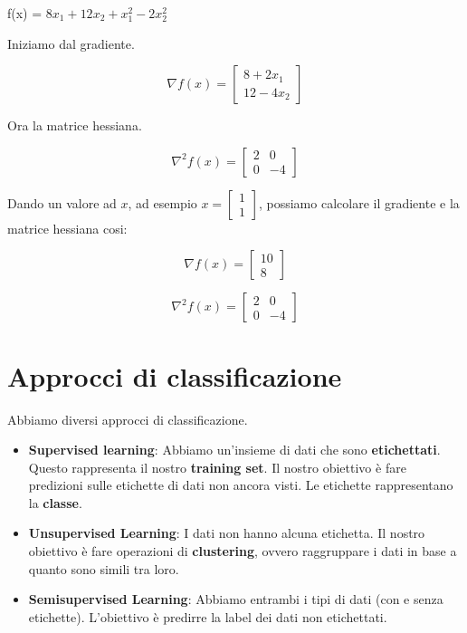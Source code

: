 \begin{esempio}
    f(x) = $8x_1 + 12x_2 + x_1^2 - 2x_2^2$

    Iniziamo dal gradiente.

    $$
        \nabla f(x) = \begin{bmatrix}
            8 +2x_1 \\
            12 - 4x_2
        \end{bmatrix}
    $$

    Ora la matrice hessiana.

    $$
        \nabla^2 f(x) = \begin{bmatrix}
            2 & 0  \\
            0 & -4
        \end{bmatrix}
    $$
    
    Dando un valore ad $x$, ad esempio $x = \begin{bmatrix}
        1 \\
        1
    \end{bmatrix}$, possiamo calcolare il gradiente e la matrice hessiana cosi:

    $$
        \nabla f(x) = \begin{bmatrix}
            10 \\
            8
        \end{bmatrix}
    $$

    $$
        \nabla^2 f(x) = \begin{bmatrix}
            2 & 0  \\
            0 & -4
        \end{bmatrix}
    $$
\end{esempio}


\section{Approcci di classificazione}
\label{sec:approcci-di-classificazione}

Abbiamo diversi approcci di classificazione.

\begin{itemize}
    \item \textbf{Supervised learning}: Abbiamo un'insieme di dati che sono \textbf{etichettati}.
          Questo rappresenta il nostro \textbf{training set}. Il nostro obiettivo è fare
          predizioni sulle etichette di dati non ancora visti. Le etichette rappresentano
          la \textbf{classe}.
    \item \textbf{Unsupervised Learning}: I dati non hanno alcuna etichetta. Il nostro
          obiettivo è fare operazioni di \textbf{clustering}, ovvero raggruppare i dati in base a quanto sono simili tra loro.
    \item \textbf{Semisupervised Learning}: Abbiamo entrambi i tipi di dati (con e senza etichette). L'obiettivo è predirre la label
          dei dati non etichettati.
\end{itemize}

